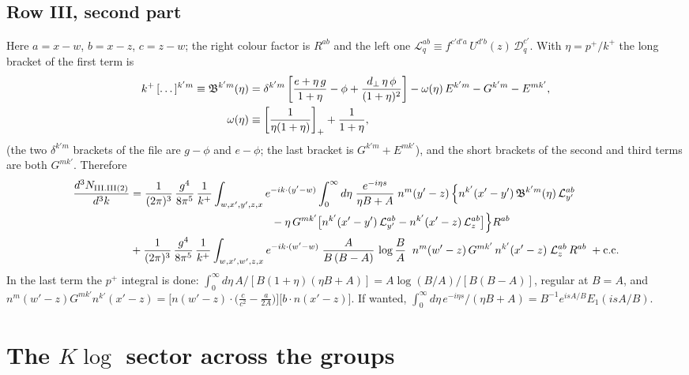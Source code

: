 \documentclass[10pt]{article}
\numberwithin{equation}{section}
\begin{document}
\subsection{Row III, second part}
Here $a=x-w$, $b=x-z$, $c=z-w$; the right colour factor is $R^{ab}$ and the left one $\mathcal{L}^{ab}_{q}\equiv f^{c'd'a}\,U^{d'b}(z)\,\mathcal{D}^{c'}_{q}$. With $\eta=p^{+}/k^{+}$ the long bracket of the first term is
\begin{align}
k^{+}\,[\dots]^{k'm}\equiv\mathfrak{B}^{k'm}(\eta)&=\delta^{k'm}\left[\frac{e+\eta\,g}{1+\eta}-\phi+\frac{d_{\perp}\,\eta\,\phi}{(1+\eta)^{2}}\right]-\omega(\eta)\,E^{k'm}-G^{k'm}-E^{mk'},\notag\\
\omega(\eta)&\equiv\left[\frac{1}{\eta(1+\eta)}\right]_{+}+\frac{1}{1+\eta}, \label{eq:B3}
\end{align}
(the two $\delta^{k'm}$ brackets of the file are $g-\phi$ and $e-\phi$; the last bracket is $G^{k'm}+E^{mk'}$), and the short brackets of the second and third terms are both $G^{mk'}$. Therefore
\begin{align}
\frac{d^{3}N_{\rm III.III(2)}}{d^{3}k}&=\frac{1}{(2\pi)^{3}}\,\frac{g^{4}}{8\pi^{5}}\,\frac{1}{k^{+}}\int_{w,x',y',z,x}e^{-ik\cdot(y'-w)}\int_{0}^{\infty}d\eta\;\frac{e^{-i\eta s}}{\eta B+A}\;n^{m}(y'-z)\,\Big\{n^{k'}(x'-y')\,\mathfrak{B}^{k'm}(\eta)\,\mathcal{L}^{ab}_{y'}\notag\\
&\hspace{4.5cm}-\eta\,G^{mk'}\big[n^{k'}(x'-y')\,\mathcal{L}^{ab}_{y'}-n^{k'}(x'-z)\,\mathcal{L}^{ab}_{z}\big]\Big\}R^{ab}\notag\\
&+\frac{1}{(2\pi)^{3}}\,\frac{g^{4}}{8\pi^{5}}\,\frac{1}{k^{+}}\int_{w,x',w',z,x}e^{-ik\cdot(w'-w)}\;\frac{A}{B\,(B-A)}\,\log\frac{B}{A}\;\;n^{m}(w'-z)\,G^{mk'}\,n^{k'}(x'-z)\;\mathcal{L}^{ab}_{z}\,R^{ab}\;+{\rm c.c.} \label{eq:GIII2}
\end{align}
In the last term the $p^{+}$ integral is done: $\int_{0}^{\infty}d\eta\,A/[B(1+\eta)(\eta B+A)]=A\log(B/A)/[B(B-A)]$, regular at $B=A$, and
$n^{m}(w'-z)G^{mk'}n^{k'}(x'-z)=\big[n(w'-z)\cdot\big(\tfrac{c}{c^{2}}-\tfrac{a}{2A}\big)\big]\big[b\cdot n(x'-z)\big]$.
If wanted, $\int_{0}^{\infty}d\eta\,e^{-i\eta s}/(\eta B+A)=B^{-1}e^{isA/B}E_{1}(isA/B)$.

\section{The $K\log$ sector across the groups}\label{sec:Ksector}
\end{document}
